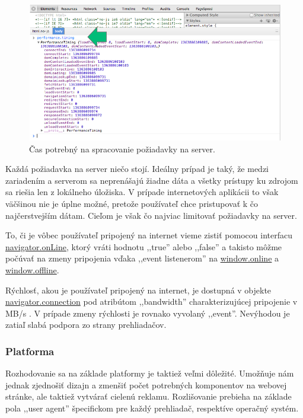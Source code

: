 \begin{figure}[H]
	\centering
	\includegraphics[width=1.0\textwidth]{img/1000ms.png}
	\caption[Čas potrebný na spracovanie požiadavky na server]{
		Čas potrebný na spracovanie požiadavky na server.}
	\label{fig: 1000ms}
\end{figure}

Každá požiadavka na server niečo stojí. Ideálny prípad je taký, že medzi zariadením a serverom sa neprenášajú žiadne dáta a všetky prístupy ku zdrojom sa riešia len z lokálneho úložiska. V prípade internetových aplikácii to však väčšinou nie je úplne možné, pretože používateľ chce pristupovať k čo najčerstvejším dátam. Cieľom je však čo najviac limitovať požiadavky na server.

To, či je vôbec používateľ pripojený na internet vieme zistiť pomocou interfacu \url{navigator.onLine}, ktorý vráti hodnotu ,,true'' alebo ,,false'' a takisto môžme počúvať na zmeny pripojenia vďaka ,,event listenerom'' na \url{window.online} a \url{window.offline}.

Rýchlosť, akou je používateľ pripojený na internet, je dostupná v objekte \url{navigator.connection} pod atribútom ,,bandwidth'' charakterizujúcej pripojenie v MB/s \cite{network}. V prípade zmeny rýchlosti je rovnako vyvolaný ,,event''. Nevýhodou je zatiaľ slabá podpora zo strany prehliadačov.


\newpage
\subsubsection{Platforma} %
\label{ssub:platforma}

Rozhodovanie sa na základe platformy je taktiež veľmi dôležité. Umožňuje nám jednak zjednošiť dizajn a zmenšiť počet potrebných komponentov na webovej stránke, ale taktiež vytvárať cielenú reklamu. Rozlišovanie prebieha na základe pola ,,user agent'' špecifickom pre každý prehliadač, respektíve operačný systém.

